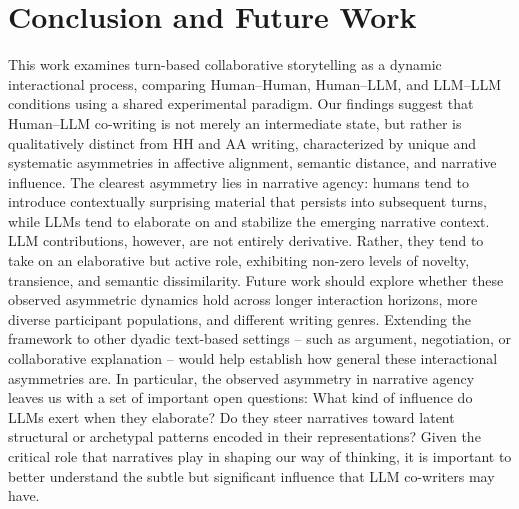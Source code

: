 \documentclass[11pt]{article}
\begin{document}
\section{Conclusion and Future Work}

This work examines turn-based collaborative storytelling as a dynamic interactional process, comparing Human--Human, Human--LLM, and LLM--LLM conditions using a shared experimental paradigm. Our findings suggest that Human--LLM co-writing is not merely an intermediate state, but rather is qualitatively distinct from HH and AA writing, characterized by unique and systematic asymmetries in affective alignment, semantic distance, and narrative influence. 
The clearest asymmetry lies in narrative agency: humans tend to introduce contextually surprising material that persists into subsequent turns, while LLMs tend to elaborate on and stabilize the emerging narrative context. LLM contributions, however, are not entirely derivative. Rather, they tend to take on an elaborative but active role, exhibiting non-zero levels of novelty, transience, and semantic dissimilarity.  
Future work should explore whether these observed asymmetric dynamics hold across longer interaction horizons, more diverse participant populations, and different writing genres. Extending the framework to other dyadic text-based settings -- such as argument, negotiation, or collaborative explanation -- would help establish how general these interactional asymmetries are.  
In particular, the observed asymmetry in narrative agency leaves us with a set of important open questions: What kind of influence do LLMs exert when they elaborate? Do they steer narratives toward latent structural or archetypal patterns encoded in their representations? Given the critical role that narratives play in shaping our way of thinking, it is important to better understand the subtle but significant influence that LLM co-writers may have.  



\end{document}
